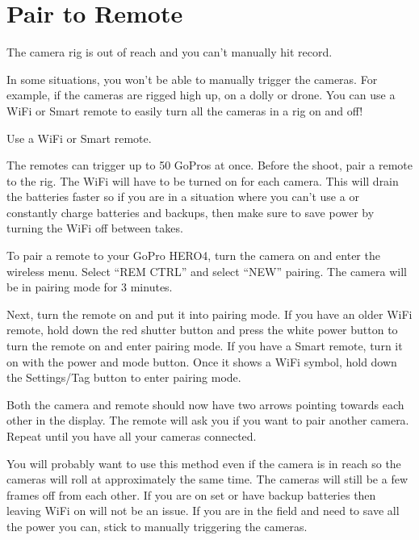 \section{Pair to Remote}
\pagecolor{white}
\label{chap:9}
\begin{fullwidth}

\problem

{\large The camera rig is out of reach and you can’t manually hit record. \par}

In some situations, you won’t be able to manually trigger the cameras. For example, if the cameras are rigged high up, on a dolly or drone. You can use a WiFi or Smart remote to easily turn all the cameras in a rig on and off!

\solution

{\large Use a WiFi or Smart remote. \par}

The remotes can trigger up to 50 GoPros at once. Before the shoot, pair a remote to the rig. The WiFi will have to be turned on for each camera. This will drain the batteries faster so if you are in a situation where you can’t use a \textbf{} or constantly charge batteries and backups, then make sure to save power by turning the WiFi off between takes. 

To pair a remote to your GoPro HERO4, turn the camera on and enter the wireless menu. Select “REM CTRL” and select “NEW” pairing. The camera will be in pairing mode for 3 minutes.


Next, turn the remote on and put it into pairing mode. If you have an older WiFi remote, hold down the red shutter button and press the white power button to turn the remote on and enter pairing mode. If you have a Smart remote, turn it on with the power and mode button. Once it shows a WiFi symbol, hold down the Settings/Tag button to enter pairing mode. 


Both the camera and remote should now have two arrows pointing towards each other in the display. The remote will ask you if you want to pair another camera. Repeat until you have all your cameras connected.


You will probably want to use this method even if the camera is in reach so the cameras will roll at approximately the same time. The cameras will still be a few frames off from each other. If you are on set or have backup batteries then leaving WiFi on will not be an issue. If you are in the field and need to save all the power you can, stick to manually triggering the cameras. 



\clearpage
\end{fullwidth}
